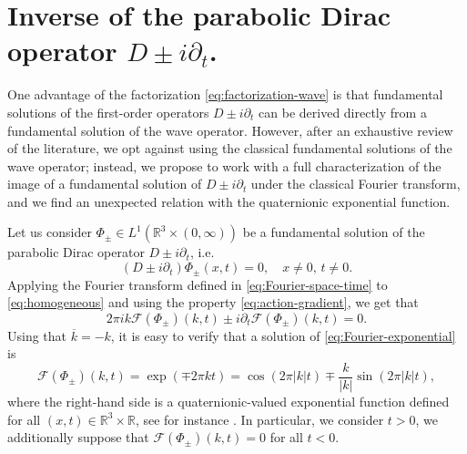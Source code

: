 \documentclass[12pt]{article}
\def\R{\mathbb{R}}
\def\R{\mathbb{R}}
\newcommand{\fourier}[1]{\mathcal{F}\left( #1 \right)}
\newcommand{\expo}[1]{\exp\left( #1\right)}
\begin{document}
\section{Inverse of the parabolic Dirac operator $D\pm i\partial_t$.}\label{sec:inverse_dirac_operator}
One advantage of the factorization \eqref{eq:factorization-wave} is that fundamental solutions of the first-order operators $D\pm i\partial_t$ can be derived directly from a fundamental solution of the wave operator. However, after an exhaustive review of the literature, we opt against using the classical fundamental solutions of the wave operator; instead, we propose to work with a full characterization of the image of a fundamental solution of $D\pm i\partial_t$ under the classical Fourier transform, and we find an unexpected relation with the quaternionic exponential function.

Let us consider $\Phi_{\pm}\in L^1(\R^3\times(0,\infty))$ be a fundamental solution of the parabolic Dirac operator $D\pm i\partial_t$, i.e.
\begin{equation}\label{eq:homogeneous}
    (D\pm i\partial_t)\Phi_\pm(x,t)=0, \quad x\ne 0,\,  t\ne 0.
\end{equation}
Applying the Fourier transform defined in \eqref{eq:Fourier-space-time} to \eqref{eq:homogeneous} and using the property \eqref{eq:action-gradient}, we get that
\begin{equation}\label{eq:Fourier-exponential}
    2\pi ik\fourier{\Phi_\pm}(k,t)\pm i\partial_t\fourier{\Phi_\pm}(k,t)=0.
\end{equation}
Using that $\overline{k}=-k$, it is easy to verify that a solution of \eqref{eq:Fourier-exponential} is
\begin{equation}\label{eq:fundamental}
    \fourier{\Phi_\pm}(k,t)=\expo{\mp 2\pi kt}=\cos\left(2\pi|k|t\right)\mp\frac{k}{|k|}\sin\left(2\pi|k|t\right),
\end{equation}
where the right-hand side is a quaternionic-valued exponential function defined for all $(x,t)\in \mathbb{R}^3\times \mathbb{R}$, see for instance \cite[Theorem~11.19]{GuHaSpr2008}.
In particular, we consider $t>0$, we additionally suppose that $\fourier{\Phi_\pm}(k,t)=0$ for all $t<0$.
\end{document}
